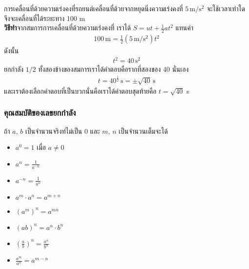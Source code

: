 \begin{example}{การเคลื่อนที่ด้วยความเร่งคงที่}รถยนต์เคลื่อนที่ด้วยจากหยุดนิ่งความเร่งคงที่ $5\,\mathrm{m}/\mathrm{s}^2$ จะใช้เวลาเท่าใดจึงจะเคลื่อนที่ได้ระยะทาง 100 m\\
\textbf{วิธีทำ}จากสมการการเคลื่อนที่ด้วยความเร่งคงที่ เราได้ $S=ut+\frac{1}{2}at^2$ แทนค่า
\begin{align*}
 	100 \,\mathrm{m} = \frac{1}{2} (5\,\mathrm{m}/\mathrm{s}^2)t^2
\end{align*}
ดังนั้น
\begin{align*}
 	t^2=40\,\mathrm{s}^2
\end{align*}
ยกกำลัง $1/2$ ทั้งสองข้างของสมการเราได้คำตอบคือรากที่สองของ 40 นั่นเอง
\begin{align*}
 	t=40^{\frac{1}{2}}\,\mathrm{s}=\pm\sqrt{40}\,\mathrm{s}
\end{align*}
และเราต้องเลือกคำตอบที่เป็นบวกนั่นคือเราได้คำตอบสุดท้ายคือ $t=\sqrt{40}$ s
\end{example}


\subsubsection{คุณสมบัติของเลขยกกำลัง}
\noindent ถ้า $a,\, b$ เป็นจำนวนจริงท่ไม่เป็น 0 และ $m,\,n$ เป็นจำนวนเต็มจะได้
\begin{itemize}
	\item $a^0=1$ เมื่อ $a\ne 0$
	\item $a^n=\frac{1}{a^{-n}}$
	\item $a^{-n}=\frac{1}{a^n}$
	\item $a^m\cdot a^n=a^{m+n}$
	\item $(a^m)^n=a^{mn}$
	\item $(ab)^n=a^n\cdot b^n$
	\item $\left(\frac{a}{b}\right)^n=\frac{a^n}{b^n}$
	\item $\frac{a^m}{a^n}=a^{m-n}$
\end{itemize}


\renewcommand{\thesection}{ข}
\renewcommand{\theequation}{\thesection.\arabic{equation}}
 \setcounter{equation}{0}
\label{SecApp2}


